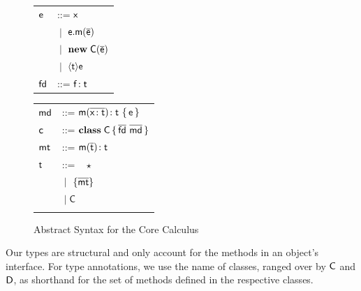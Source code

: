 \documentclass[preprint]{sigplanconf}
\newcommand{\fd}{\M{\xt{fd}}}
\newcommand{\md}{\M{\xt{md}}}
\newcommand{\mt}{\M{\xt{mt}}}
\newcommand{\m}{\M{\xt{m}}}
\newcommand{\e}{\M{\xt{e}}}
\newcommand{\f}{\M{\xt{f}}}
\newcommand{\x}{\M{\xt{x}}}
\renewcommand{\t}{\M{\xt{t}}}
\renewcommand{\c}{\M{\xt{c}}}
\newcommand{\C}{\M{\xt{C}}}
\newcommand{\D}{\M{\xt{D}}}
\newcommand{\new}{\M{\bt{new}}}
\newcommand{\Get}[2]{\M{#1.#2}}
\newcommand{\Set}[3]{\M{#1.#2:=#3}}
\newcommand{\Call}[3]{\M{#1.#2(#3)}}
\newcommand{\New}[2]{\M{\new\;#1({#2})}}
\newcommand{\Cast}[2]{\M{\langle{#1}\rangle{#2}}}
\newcommand{\any}{\M{\star}}
\newcommand{\Type}[1]{\M{\{ #1 \}}}
\newcommand{\HT}[2]{\M{{#1}\!:{#2}}}
\newcommand{\Mdef}[5]{\M{ \HT { #1( \b{\HT{#2}{#3}})}{#4}~ \{\, {#5} \,\} }}
\newcommand{\Ftype}[2]{\M{ \HT{#1}{#2} }}
\newcommand{\Mtype}[3]{\M{ \HT { #1( #2 )}{#3}}}
\newcommand{\Class}[3]{\M{\bt{class}\;#1\,\{\, #2 ~ #3\, \}}}
\newcommand{\Alt}[1]{ &\B #1 \\}
\newcommand{\B}{\M{~|~}}
\newcommand{\M}[1]{\ensuremath{#1}\xspace}
\newcommand{\xt}[1]{{\sf{#1}}\xspace}
\newcommand{\bt}[1]{\xt{\bf #1}}
\renewcommand{\b}[1]{\M{\overline{#1}}}
\begin{document}
\begin{figure}[!h]\center\begin{minipage}{4cm}\begin{tabular}{l@{~~~}l}
\e &::=  \x \\
   \Alt{ \Call\e\m{\b\e} }
   \Alt{ \New\C{\b\e} }
   \Alt{ \Cast\t\e }
\fd &::= 
    \Ftype\f\t   \\
\end{tabular}\end{minipage}\begin{minipage}{4cm}\begin{tabular}{l@{~~~}l}
\md &::=
    \Mdef\m\x\t\t\e \\
\c &::= \Class \C {\b{\fd}}{\b{\md} } \\
\mt &::= \Mtype\m{\b\t}\t\\
\t &::= ~ \any \\
   \Alt{ \Type{  \b{ \mt } } }
   \Alt\C \\
\end{tabular}\end{minipage}
\caption{Abstract Syntax for the Core Calculus}\label{syn}
\end{figure}

Our types are structural and only account for the methods in an object's
interface. For type annotations, we use the name of classes, ranged over by
\C and \D, as shorthand for the set of methods defined in the respective
classes.
\end{document}
